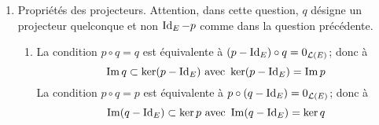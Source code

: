 \begin{enumerate}
  \item Propriétés des projecteurs. Attention, dans cette question, $q$ désigne un projecteur quelconque et non $\operatorname{Id}_E -p$ comme dans la question précédente.
\begin{enumerate}
  \item La condition $p\circ q = q$ est équivalente à $(p-\operatorname{Id}_E)\circ q = 0_{\mathcal{L}(E)}$; donc à
\begin{displaymath}
  \operatorname{Im} q \subset  \ker(p-\operatorname{Id}_E) \text{ avec }\ker(p-\operatorname{Id}_E) = \operatorname{Im} p
\end{displaymath}
 La condition $p\circ q = p$ est équivalente à $p\circ(q-\operatorname{Id}_E)=0_{\mathcal{L}(E)}$; donc à 
\begin{displaymath}
  \operatorname{Im}(q-\operatorname{Id}_E) \subset \ker p \text{ avec } \operatorname{Im}(q-\operatorname{Id}_E) = \ker q
\end{displaymath}


\end{enumerate}
\end{enumerate}
